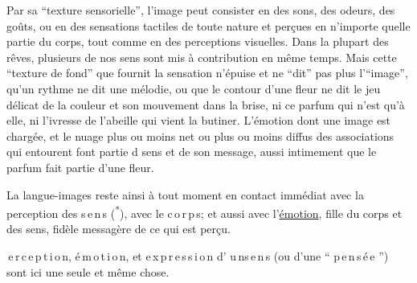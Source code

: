 
Par sa ``texture sensorielle'', l'image peut consister en des sons,  des odeurs,  des goûts, ou en des sensations tactiles de toute nature et perçues en n'importe quelle partie du corps, tout comme en des perceptions visuelles. Dans la plupart des rêves, plusieurs de nos sens sont mis à contribution en même temps. Mais cette ``texture de fond'' que fournit la sensation n'épuise et ne ``dit'' pas plus l'``image'', qu'un rythme ne dit une mélodie, ou que le contour d'une fleur ne dit le jeu délicat de la couleur et son mouvement dans la brise, ni ce parfum qui n'est qu'à elle, ni l'ivresse de l'abeille qui vient la butiner. L'émotion dont une image est chargée, et  le nuage plus ou moins net ou plus ou moins diffus des associations qui entourent\handwritten{,} font partie d  sens  et de son message, aussi intimement que le parfum fait partie d'une fleur.

La langue-images reste ainsi\handwritten{,} à tout moment\handwritten{,} en contact immédiat avec la perception des \mbox{s\,e\,n\,s} (\textsuperscript{*}), avec le \mbox{c\,o\,r\,p\,s}\handwritten{\inserted{(**)}}; et aussi avec l'\uline{émotion}, fille du corps et des sens, fidèle messagère de ce qui est perçu.

 \mbox{\,e\,r\,c\,e\,p\,t\,i\,o\,n}, \mbox{é\,m\,o\,t\,i\,o\,n}, et \mbox{e\,x\,p\,r\,e\,s\,s\,i\,o\,n} d' \mbox{u\,n\quad s\,e\,n\,s} (ou d'une `` \mbox{p\,e\,n\,s\,é\,e} '') sont  ici une seule et même chose.


